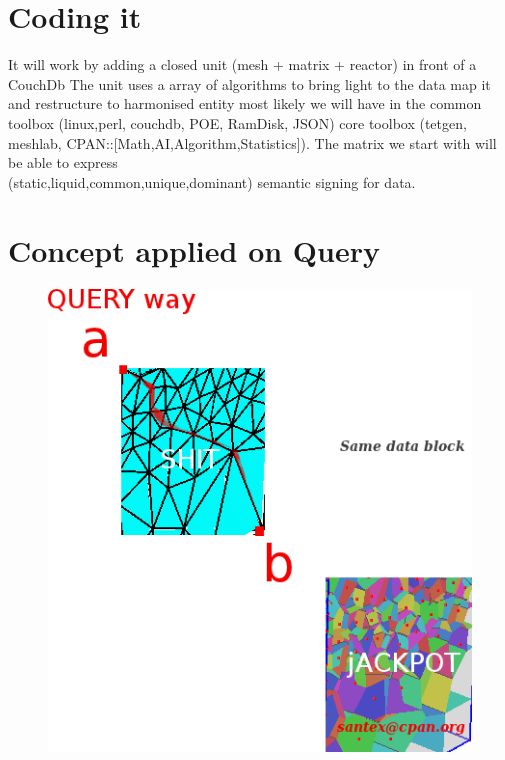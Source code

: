 \documentclass[11pt]{article}
\begin{document}
\begin{itemize}
\section{Coding it}
It will work by adding a closed unit (mesh + matrix + reactor) in front of a CouchDb
The unit uses a array of algorithms to bring light to the data map it and restructure to harmonised entity most likely we will have in the 
common toolbox (linux,perl, couchdb, POE, RamDisk, JSON)
core toolbox (tetgen, meshlab, CPAN::[Math,AI,Algorithm,Statistics]).
The matrix we start with will be able to express \\
(static,liquid,common,unique,dominant) semantic signing for data.


\section{Concept applied on Query}
\begin{figure}[htp]
\includegraphics[scale=0.63]{image/research-base-003.png}


\end{figure}
\end{itemize}
\end{document}
